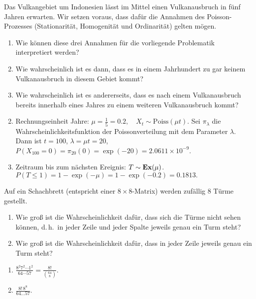  Das Vulkangebiet um Indonesien l\"asst im Mittel einen Vulkanausbruch
in f\"unf Jahren erwarten. Wir setzen voraus, dass dafür die Annahmen des
Poisson-Prozesses (Stationarität, Homogenität und Ordinarität) gelten mögen.
\begin{enumerate}
    \item Wie können diese drei Annahmen für die vorliegende Problematik interpretiert werden?

    \item Wie wahrscheinlich ist es dann, dass es in einem Jahrhundert zu gar keinem Vulkanausbruch in diesem
    Gebiet kommt?
    \item Wie wahrscheinlich ist es andererseits, dass es nach einem Vulkanausbruch bereits innerhalb eines Jahres zu einem
    weiteren Vulkanausbruch kommt?
\end{enumerate}

\solution
\begin{enumerate}
        \setcounter{enumi}{1}
    \item Rechnungseinheit Jahre: $\mu=\frac{1}{5}=0.2, \quad X_t \sim \text{Poiss}(\mu t).$
        Sei $\pi_{\lambda}$ die Wahrscheinlichkeitsfunktion der Poissonverteilung mit dem Parameter $\lambda$. Dann ist
        $t=100$, $\lambda=\mu t=20$, $P(X_{100}=0)=\pi_{20}(0)= \exp(-20)=2.0611 \times 10^{-9}$.
    \item Zeitraum bis zum nächsten Ereignis: $T \sim \mathbf{Ex}(\mu)$.
        $P(T \le 1)=1-\exp(-\mu)=1-\exp(-0.2)=0.1813.$
\end{enumerate}

 Auf ein Schachbrett (entspricht einer 
$8\times 8$-Matrix) werden zufällig $8$ Türme gestellt. 
\begin{enumerate}
    \item Wie groß ist die Wahrscheinlichkeit dafür, dass sich die Türme nicht
        sehen können, d.\,h.\ in jeder Zeile und jeder Spalte jeweils genau ein
        Turm steht?
    \item Wie groß ist die Wahrscheinlichkeit dafür, dass in jeder Zeile jeweils
        genau ein Turm steht?
\end{enumerate}

\solution
\begin{enumerate}
    \item $\frac{8^2 7^2 \cdots 1^2}{ 64 \cdots 57} = \frac{8!}{ \binom{64}{8}}$.
    \item $\frac{8!\, 8^8}{64 \dots 57}$.
\end{enumerate}

